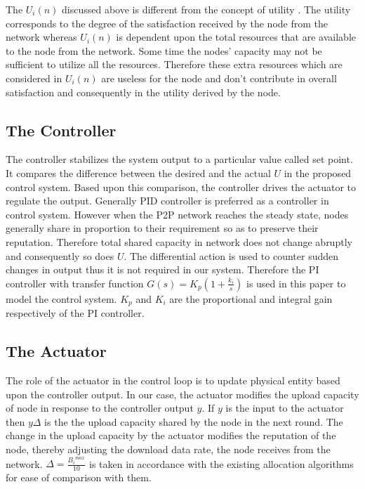 \documentclass[journal]{IEEEtran}
\begin{document}
The $U_i(n)$ discussed above is different from the concept of utility  \cite{Shenker}. The utility corresponds to the degree of the satisfaction received by the node from the network whereas $U_i(n)$ is dependent upon the total resources that are available to the node from the network. Some time the nodes' capacity may not be sufficient to utilize all the resources. Therefore these extra resources which are considered in $U_i(n)$ are useless for the node and don't contribute in overall satisfaction and consequently in the utility derived by the node. 
\subsection{The Controller}
The controller \cite{Ogata} stabilizes the system output to a particular value called set point. It compares the difference between the desired and the actual $U$ in the proposed control system. Based upon this comparison, the controller drives the actuator to regulate the output. Generally PID controller is preferred as a controller in control system. However when the P2P network reaches the steady state, nodes generally share in proportion to their requirement so as to preserve their reputation. Therefore total shared capacity in network does not change abruptly and consequently so does $U$. The differential action is used to counter sudden changes in output thus it is not required in our system. Therefore the PI controller with transfer function $G(s)=K_{p}(1+\frac{k_i}{s})$ \cite{Ogata} is used  in this paper to model the control system. $K_{p}$ and $K_{i}$ are  the proportional and integral gain respectively  of the PI controller.
\subsection{The Actuator}
\label{act}
The role of the actuator \cite{Ogata} in the control loop is to update physical entity based upon the controller output. In our case, the actuator modifies the upload capacity of node in response to the controller output $y$. If $y$ is the input to the actuator then $y\Delta$ is the the upload capacity shared by the node in the next round. The change in the upload capacity by the actuator modifies the reputation of the node, thereby adjusting the download data rate, the node receives from the network. $\Delta=\frac{{B_i}^{max}}{10}$ is taken in accordance with the existing allocation algorithms \cite{Satsiou}\cite{probabilistic_allocation} for ease of comparison with them.
\end{document}
